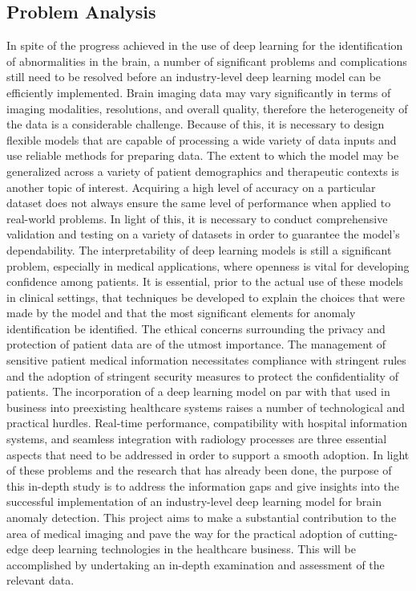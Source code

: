 \subsection{Problem Analysis}
In spite of the progress achieved in the use of deep learning for the identification of abnormalities in the brain, a number of significant problems and complications still need to be resolved before an industry-level deep learning model can be efficiently implemented. Brain imaging data may vary significantly in terms of imaging modalities, resolutions, and overall quality, therefore the heterogeneity of the data is a considerable challenge. Because of this, it is necessary to design flexible models that are capable of processing a wide variety of data inputs and use reliable methods for preparing data. The extent to which the model may be generalized across a variety of patient demographics and therapeutic contexts is another topic of interest. Acquiring a high level of accuracy on a particular dataset does not always ensure the same level of performance when applied to real-world problems. In light of this, it is necessary to conduct comprehensive validation and testing on a variety of datasets in order to guarantee the model's dependability. The interpretability of deep learning models is still a significant problem, especially in medical applications, where openness is vital for developing confidence among patients. It is essential, prior to the actual use of these models in clinical settings, that techniques be developed to explain the choices that were made by the model and that the most significant elements for anomaly identification be identified. The ethical concerns surrounding the privacy and protection of patient data are of the utmost importance. The management of sensitive patient medical information necessitates compliance with stringent rules and the adoption of stringent security measures to protect the confidentiality of patients.  The incorporation of a deep learning model on par with that used in business into preexisting healthcare systems raises a number of technological and practical hurdles. Real-time performance, compatibility with hospital information systems, and seamless integration with radiology processes are three essential aspects that need to be addressed in order to support a smooth adoption. In light of these problems and the research that has already been done, the purpose of this in-depth study is to address the information gaps and give insights into the successful implementation of an industry-level deep learning model for brain anomaly detection. This project aims to make a substantial contribution to the area of medical imaging and pave the way for the practical adoption of cutting-edge deep learning technologies in the healthcare business. This will be accomplished by undertaking an in-depth examination and assessment of the relevant data.


